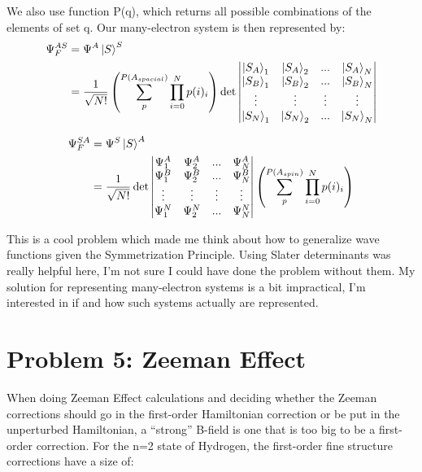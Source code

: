 \documentclass[10pt]{article} %
\begin{document}
We also use function P(q), which returns all possible combinations of the elements of set q. Our
many-electron system is then represented by:\\

\begin{align*}
  \Psi_F^{AS} &= \Psi^A\ket{S}^S\\
  &= \frac{1}{\sqrt{N!}}\left(\sum_p^{P(A_{spacial})}\prod_{i=0}^N p(i)_i\right)\det
  \begin{vmatrix}
    \ket{S_A}_1 & \ket{S_A}_2 & ... & \ket{S_A}_N\\
    \ket{S_B}_1 & \ket{S_B}_2 & ... & \ket{S_B}_N\\
    \vdots & \vdots & \vdots & \vdots\\
    \ket{S_N}_1 & \ket{S_N}_2 & ... & \ket{S_N}_N\\
  \end{vmatrix}
\end{align*}

\begin{align*}
  \Psi_F^{SA} &= \Psi^S\ket{S}^A\\
  &= \frac{1}{\sqrt{N!}}\det
  \begin{vmatrix}
    \Psi^A_1 & \Psi^A_2 & ... & \Psi^A_N\\
    \Psi^B_1 & \Psi^B_2 & ... & \Psi^B_N\\
    \vdots & \vdots & \vdots & \vdots\\
    \Psi^N_1 & \Psi^N_2 & ... & \Psi^N_N\\
  \end{vmatrix}
  \left(\sum_p^{P(A_{spin})}\prod_{i=0}^N p(i)_i\right)
\end{align*}

This is a cool problem which made me think about how to generalize wave functions given the
Symmetrization Principle. Using Slater determinants was really helpful here, I'm not sure I could
have done the problem without them. My solution for representing many-electron systems is a bit
impractical, I'm interested in if and how such systems actually are represented.\\

\section{Problem 5: Zeeman Effect}
When doing Zeeman Effect calculations and deciding whether the Zeeman corrections should go in the
first-order Hamiltonian correction or be put in the unperturbed Hamiltonian, a ``strong'' B-field
is one that is too big to be a first-order correction. For the n=2 state of Hydrogen, the
first-order fine structure corrections have a size of:
\end{document}

